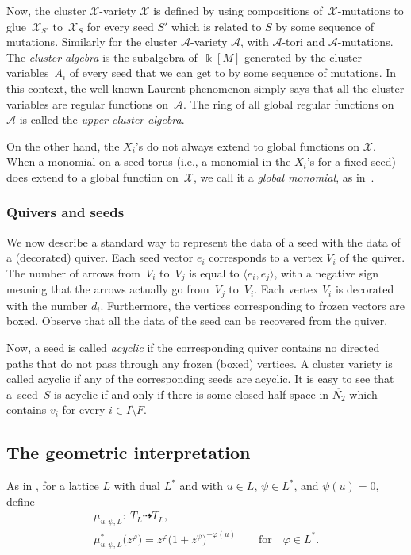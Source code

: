 \documentclass[11pt]{article}
\numberwithin{equation}{section}
\numberwithin{figure}{section}
\numberwithin{table}{section}
\let\?=\overline
\let\s=\mathcal
\newcommand {\kk} {\Bbbk}
\theoremstyle{definition}
\begin{document}
Now, the cluster $\s{X}$-variety $\s{X}$ is defined by using compositions of~$\s{X}$-mutations to glue~$\s{X}_{S'}$ to~$\s{X}_S$ for every seed $S'$ which is related to $S$ by some sequence of mutations. Similarly for the cluster $\s{A}$-variety $\s{A}$, with $\s{A}$-tori and $\s{A}$-mutations. The {\it cluster algebra} is the subalgebra of~$\kk[M]$ generated by the cluster variables~$A_i$ of every seed that we can get to by some sequence of mutations. In this context, the well-known Laurent phenomenon simply says that all the cluster variables are regular functions on~$\s{A}$. The ring of all global regular functions on~$\s{A}$ is called the {\it upper cluster algebra}.

On the other hand, the $X_i$'s do not always extend to global functions on $\s{X}$. When a monomial on a seed torus (i.e., a monomial in the $X_i$'s for a fixed seed) does extend to a global function on~$\s{X}$, we call it a {\it global monomial}, as in~\cite{GHK3}.

\subsubsection{Quivers and seeds}\label{quivers}

We now describe a standard way to represent the data of a seed with the data of a (decorated) quiver. Each seed vector $e_i$ corresponds to a vertex $V_i$ of the quiver. The number of arrows from~$V_i$ to~$V_j$ is equal to $\langle e_i , e_j\rangle$, with a negative sign meaning that the arrows actually go from~$V_j$ to~$V_i$. Each vertex $V_i$ is decorated with the number $d_i$. Furthermore, the vertices corresponding to frozen vectors are boxed. Observe that all the data of the seed can be recovered from the quiver.

Now, a seed is called {\it acyclic} if the corresponding quiver contains no directed paths that do not pass through any frozen (boxed) vertices. A cluster variety is called acyclic if any of the corresponding seeds are acyclic. It is easy to see that a~seed~$S$ is acyclic if and only if there is some closed half-space in $\?{N_2}$ which contains $v_i$ for every $i\in I\setminus F$.

\subsection{The geometric interpretation}\label{geom int}

As in \cite{GHK3}, for a lattice $L$ with dual $L^*$ and with $u \in L$, $\psi \in L^*$, and $\psi(u)=0$, define
\begin{gather*}
	\mu_{u,\psi,L}\colon \ T_L \dashrightarrow T_L, \\
	\mu_{u,\psi,L}^*\big(z^{\varphi}\big) = z^\varphi\big(1+z^{\psi}\big)^{-\varphi(u)} \qquad \text{for} \quad \varphi\in L^*.
\end{gather*}
\end{document}
